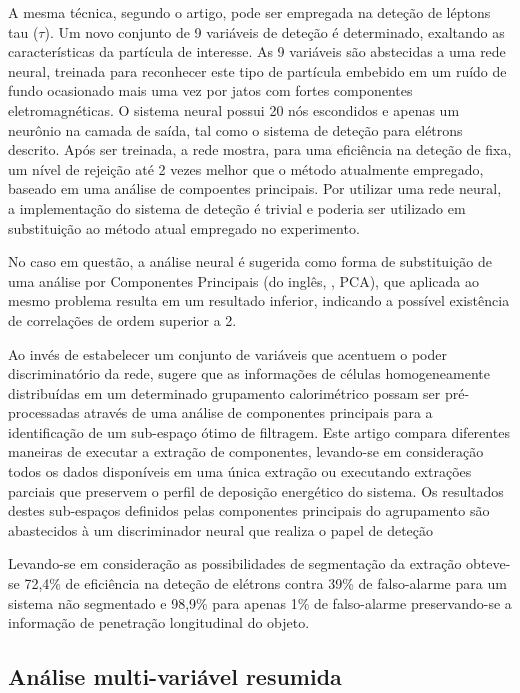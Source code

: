 A mesma técnica, segundo o artigo, pode ser empregada na deteção de léptons
tau ($\tau$). Um novo conjunto de 9 variáveis de deteção é determinado,
exaltando as características da partícula de interesse. As 9 variáveis são
abstecidas a uma rede neural, treinada para reconhecer este tipo de partícula
embebido em um ruído de fundo ocasionado mais uma vez por jatos com fortes
componentes eletromagnéticas. O sistema neural possui 20 nós escondidos e
apenas um neurônio na camada de saída, tal como o sistema de deteção para
elétrons descrito. Após ser treinada, a rede mostra, para uma eficiência na
deteção de  fixa, um nível de rejeição até 2 vezes melhor que o
método atualmente empregado, baseado em uma análise de compoentes
principais. Por utilizar uma rede neural, a implementação do sistema de
deteção é trivial e poderia ser utilizado em substituição ao método atual
empregado no experimento.

No caso em questão, a análise neural é sugerida como forma de substituição de
uma análise por Componentes Principais (do inglês, , PCA), que aplicada ao mesmo problema resulta em um resultado
inferior, indicando a possível existência de correlações de ordem superior a
2. 

Ao invés de estabelecer um conjunto de variáveis que acentuem o poder
discriminatório da rede, \cite{vassali-acat-2001} sugere que as informações de
células homogeneamente distribuídas em um determinado grupamento calorimétrico
possam ser pré-processadas através de uma análise de componentes principais
para a identificação de um sub-espaço ótimo de filtragem. Este artigo compara
diferentes maneiras de executar a extração de componentes, levando-se em
consideração todos os dados disponíveis em uma única extração ou executando
extrações parciais que preservem o perfil de deposição energético do
sistema. Os resultados destes sub-espaços definidos pelas componentes
principais do agrupamento são abastecidos à um discriminador neural que
realiza o papel de deteção

Levando-se em consideração as possibilidades de segmentação da extração
obteve-se 72,4\% de eficiência na deteção de elétrons contra 39\% de
falso-alarme para um sistema não segmentado e 98,9\% para apenas 1\% de
falso-alarme preservando-se a informação de penetração longitudinal do
objeto.

\subsection{Análise multi-variável resumida}

